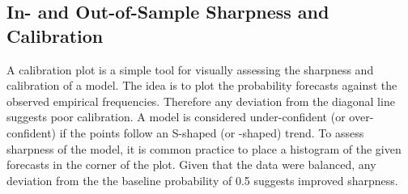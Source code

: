 \documentclass[aoas, preprint]{imsart}
\numberwithin{equation}{section}
\theoremstyle{plain}
\begin{document}
\subsection{In- and Out-of-Sample Sharpness and Calibration}
\label{calibration}
A calibration plot is a simple tool for visually assessing the sharpness and calibration of a model. The idea is to plot the probability forecasts against the observed empirical frequencies. Therefore any deviation from the diagonal line suggests poor calibration. A model is considered under-confident (or over-confident) if the points follow an S-shaped (or -shaped) trend. To assess sharpness of the model, it is common practice to place a histogram of the given forecasts in the corner of the plot. Given that the data were balanced, any deviation from the the baseline probability of 0.5 suggests improved sharpness.
\end{document}
